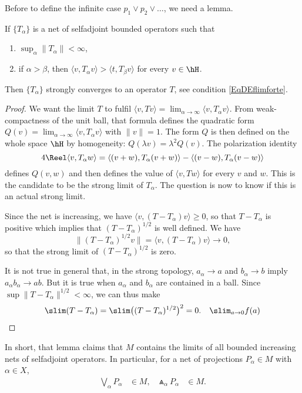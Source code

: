 Before to define the infinite case $p_1\vee p_2\vee\ldots$, we need a lemma.

\begin{lemma}
If $\{ T_{\alpha} \}$ is a net of selfadjoint bounded operators such that
\begin{enumerate}
\item $\sup_{\alpha}\| T_{\alpha} \|<\infty$,
\item if $\alpha >\beta$, then $\langle v, T_{\alpha} v\rangle >\langle t, T_{\beta} v\rangle $ for every $v\in\hH$.
\end{enumerate}
Then $\{ T_{\alpha} \}$ strongly converges to an operator $T$, see condition \eqref{EqDEflimforte}.
\end{lemma}

\begin{proof}
We want the limit $T$ to fulfil $\langle v, Tv\rangle =\lim_{\alpha\to\infty}\langle v, T_{\alpha} v\rangle$. From weak-compactness of the unit ball, that formula defines the quadratic form $Q(v)=\lim_{\alpha\to\infty}\langle v, T_{\alpha} v\rangle $ with $\| v \|=1$. The form $Q$ is then defined on the whole space $\hH$ by homogeneity: $Q(\lambda v)=\lambda^2 Q(v)$. The polarization identity
\[ 
  4\Reel\langle v, T_{\alpha} w\rangle =\langle (v+w), T_{\alpha}(v+w)\rangle -\langle (v-w), T_{\alpha}(v-w)\rangle 
\]
defines $Q(v,w)$ and then defines the value of $\langle v, Tw\rangle $ for every $v$ and $w$. This is the candidate to be the strong limit of $T_{\alpha}$. The question is now to know if this is an actual strong limit.

Since the net is increasing, we have $\langle v, (T-T_{\alpha})v\rangle \geq0$, so that $T-T_{\alpha}$ is positive which implies that $(T-T_{\alpha})^{1/2}$ is well defined. We have
\[ 
  \| (T-T_{\alpha})^{1/2}v \|=\langle v, (T-T_{\alpha})v\rangle \to 0,
\]
so that the strong limit of $(T-T_{\alpha})^{1/2}$ is zero. 

It is not true in general that, in the strong topology, $a_{\alpha}\to a$ and $b_{\alpha}\to b$ imply $a_{\alpha} b_{\alpha}\to ab$. But it is true when $a_{\alpha}$ and $b_{\alpha}$ are contained in a ball. Since $\sup \| T-T_{\alpha} \|^{1/2}<\infty$, we can thus make
\[ 
  \slim(T-T_{\alpha})=\slim\big( (T-T_{\alpha})^{1/2} \big)^2=0.\quad \slim_{a\to 0}f(a)
\]
\end{proof}
In short, that lemma claims that $M$ contains the limits of all bounded increasing nets of selfadjoint operators. In particular, for a net of projections $P_{\alpha}\in M$ with $\alpha\in X$,
\begin{align*}
	\bigvee_{\alpha}P_{\alpha}&\in M,&
	\Wedge_{\alpha}P_{\alpha}&\in M.
\end{align*}


